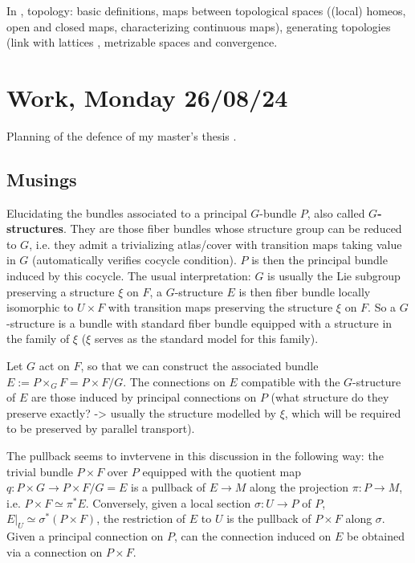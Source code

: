 \documentclass[a4paper,12pt,parskip=half*,chapterprefix=true,numbers=noendperiod]{scrreprt}
\theoremstyle{definition}
\theoremstyle{remark}
\begin{document}
In \cite{personal:BasicsDiffGeo}, topology: basic definitions, maps between topological spaces ((local) homeos, open and closed maps, characterizing continuous maps), generating topologies (link with lattices \cite{personal:Lattices}, metrizable spaces and convergence.

\section{Work, Monday 26/08/24}

Planning of the defence of my master's thesis \cite{personalHand:MasterThesis}.

\subsection{Musings}

Elucidating the bundles associated to a principal $G$-bundle $P$, also called \textbf{$G$-structures}. They are those fiber bundles whose structure group can be reduced to $G$, i.e. they admit a trivializing atlas/cover with transition maps taking value in $G$ (automatically verifies cocycle condition). $P$ is then the principal bundle induced by this cocycle. The usual interpretation: $G$ is usually the Lie subgroup preserving a structure $\xi$ on $F$, a $G$-structure $E$ is then fiber bundle locally isomorphic to $U\times F$ with transition maps preserving the structure $\xi$ on $F$. So a $G$-structure is a bundle with standard fiber bundle equipped with a structure in the family of $\xi$ ($\xi$ serves as the standard model for this family).

Let $G$ act on $F$, so that we can construct the associated bundle $E:=P\times_GF=P\times F/G$. The connections on $E$ compatible with the $G$-structure of $E$ are those induced by principal connections on $P$ (what structure do they preserve exactly? -> usually the structure modelled by $\xi$, which will be required to be preserved by parallel transport).

The pullback seems to invtervene in this discussion in the following way: the trivial bundle $P\times F$ over $P$ equipped with the quotient map $q:P\times G\to P\times F/G=E$ is a pullback of $E\to M$ along the projection $\pi:P\to M$, i.e. $P\times F\simeq \pi^*E$. Conversely, given a local section $\sigma :U\to P$ of $P$, $E|_U\simeq \sigma^*(P\times F)$, the restriction of $E$ to $U$ is the pullback of $P\times F$ along $\sigma$. Given a principal connection on $P$, can the connection induced on $E$ be obtained via a connection on $P\times F$.
\end{document}
